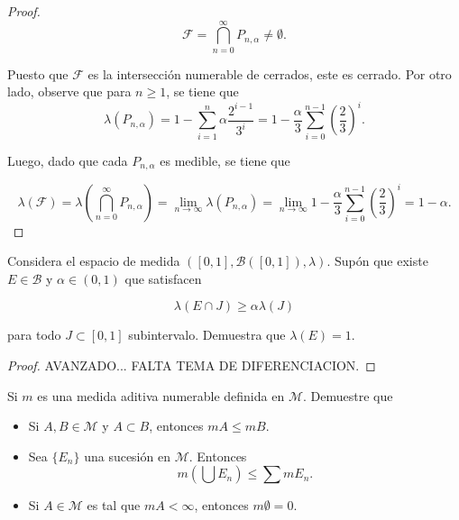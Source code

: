 \documentclass[12pt]{article}
\newenvironment{problem}[2][Problema]{\begin{trivlist}
\item[\hskip \labelsep {\bfseries #1}\hskip \labelsep {\bfseries #2.}]}{\end{trivlist}}
\begin{document}
\begin{proof}
$$ \mathcal{F} = \bigcap_{n=0}^\infty P_{n, \alpha} \neq \emptyset.$$

Puesto que $\mathcal{F}$ es la intersección numerable de cerrados, este es cerrado. Por otro lado, observe que para $n \geq 1$, se tiene que
$$\lambda(P_{n, \alpha}) = 1 - \sum_{i=1}^{n}{ \alpha \frac{2^{i-1}}{3^i}} = 1 - \frac{\alpha}{3} \sum_{i=0}^{n-1}{ \left(\frac{2}{3}\right)^i} .$$

Luego, dado que cada $P_{n,\alpha}$ es medible, se tiene que 

$$\lambda(\mathcal{F}) = \lambda\left(\bigcap_{n=0}^{\infty} P_{n, \alpha} \right) = \lim_{n\to \infty}\lambda(P_{n, \alpha}) =  \lim_{n\to \infty}1 - \frac{\alpha}{3} \sum_{i=0}^{n-1}{ \left(\frac{2}{3}\right)^i} = 1 - \alpha.  $$

\end{proof}

\text{ }
\begin{problem}{2}  Considera el espacio de medida $([0, 1], \mathbf{\mathcal{B}}([0, 1]), \lambda)$. Supón que existe $E \in \mathbf{\mathcal{B}}$ y $\alpha \in (0, 1)$ que satisfacen 

$$ \lambda(E \cap J) \geq  \alpha \lambda(J)$$

para todo $J\subset [0, 1]$ subintervalo. Demuestra que $\lambda(E) = 1.$
\end{problem}
\begin{proof}
AVANZADO... FALTA TEMA DE DIFERENCIACION.
\end{proof}

\begin{problem}{3} Si $m$ es una medida aditiva numerable definida en $\mathcal M$. Demuestre que 

\begin{itemize}
    \item[a)] Si $A, B \in \mathcal M$ y $A \subset B $, entonces $m A \leq m B$. 
    \item[b)] Sea $\{ E_n \}$ una sucesión en $\mathcal M$. Entonces 
    $$ m\left( \bigcup E_n \right) \leq \sum m E_n.$$
    \item[c)] Si $A \in \mathcal M$ es tal que $m A < \infty $, entonces $m \emptyset = 0.$
\end{itemize}
\end{problem}
\end{document}
